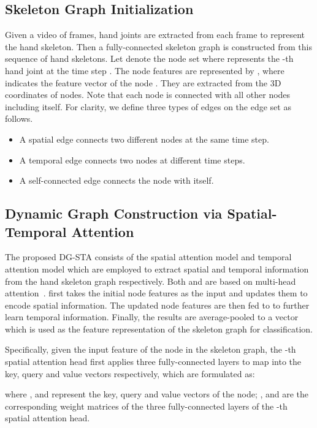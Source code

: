 \documentclass{bmvc2k}
\begin{document}
\subsection{Skeleton Graph Initialization}
\label{sec:init_g}
Given a video of  frames,  hand joints are extracted from each frame to represent the hand skeleton. Then a fully-connected skeleton graph  is constructed from this sequence of hand skeletons. Let  denote the node set where  represents the -th hand joint at the time step . The node features are represented by , where  indicates the feature vector of the node . They are extracted from the 3D coordinates of nodes. Note that each node is connected with all other nodes including itself. For clarity, we define three types of edges on the edge set  as follows. 
\begin{itemize}
\item A spatial edge  connects two different nodes at the same time step.
\item A temporal edge  connects two nodes at different time steps.
\item A self-connected edge  connects the node with itself. 
\end{itemize}





\subsection{Dynamic Graph Construction via Spatial-Temporal Attention}
\label{sec:sta_graph}



The proposed  DG-STA consists of the spatial attention model  and temporal attention model  which are employed to extract spatial and temporal information from the hand skeleton graph respectively. Both  and  are based on multi-head attention~\cite{vaswani2017attention}.  first takes the initial node features  as the input and updates them to encode spatial information. The updated node features are then fed to  to further learn temporal information. Finally, the results are average-pooled to a vector which is used as the feature representation of the skeleton graph for classification.


Specifically, given the input feature  of the node  in the skeleton graph, the -th spatial attention head first applies three fully-connected layers to map  into the key, query and value vectors respectively, which are formulated as:

where ,  and  represent the key, query and value vectors of the node; ,  and  are the corresponding weight matrices of the three fully-connected layers of the -th spatial attention head.
\end{document}
